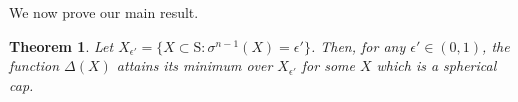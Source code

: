 \documentclass[letterpaper, 10 pt, conference]{ieeeconf}  %
\newcommand{\convhull}{\mbox{convhull } }
\newcommand{\R}{\mathbb{R} }
\newcommand{\conv}{\convhull }
\newcommand{\sphere}{\text{S}}
\newcommand{\ball}{\text{B}}
\newtheorem{theorem}{Theorem}[section]
\newtheorem{lemma}[theorem]{Lemma}
\begin{document}


%
%

We now prove our main result.
\begin{theorem}Let $X_{\epsilon'} = \{X \subset \sphere: \sigma^{n-1}(X) = \epsilon'\}$. Then, for any $\epsilon' \in (0,1)$, the function $\Delta(X)$ attains its minimum over $X_{\epsilon'}$ for some $X$ which is a spherical cap.
\end{theorem}
\end{document}
